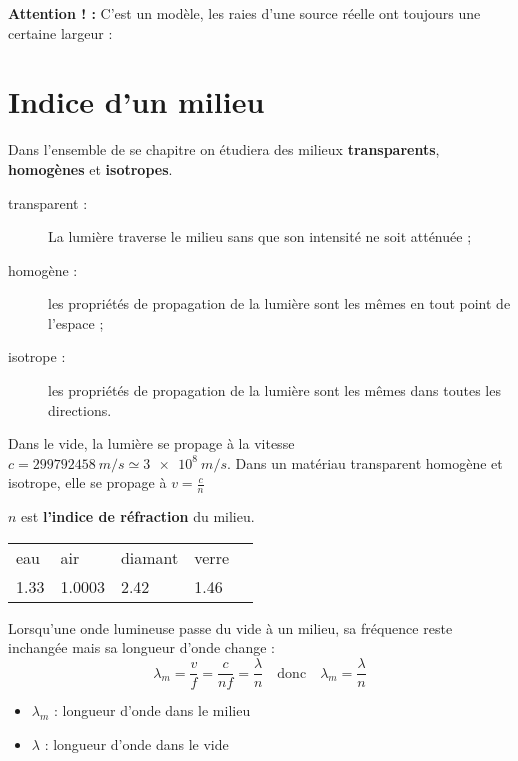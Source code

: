 \documentclass{cours}
\begin{document}
\textbf{Attention ! :} C'est un modèle, les raies d'une source réelle ont toujours une certaine largeur :
\begin{center}
\end{center}


\section{Indice d'un milieu}
Dans l'ensemble de se chapitre on étudiera des milieux \textbf{transparents}, \textbf{homogènes} et \textbf{isotropes}.
\begin{description}
\item[transparent : ] La lumière traverse le milieu sans que son intensité ne soit atténuée ; 
\item[homogène : ] les propriétés de propagation de la lumière sont les mêmes en tout point de l'espace ;
\item[isotrope :] les propriétés de propagation de la lumière sont les mêmes dans toutes les directions.  
\end{description}

Dans le vide, la lumière se propage à la vitesse $c=\SI{299792458}{m/s} \simeq \SI{3e8}{m/s}$. Dans un matériau transparent homogène et isotrope, elle se propage à $v=\frac{c}{n}$

$n$ est \textbf{l'indice de réfraction} du milieu.

\begin{center}
  \begin{tabular}{@{}lllll@{}}
    \toprule
    eau & air & diamant & verre \\
    1.33 & 1.0003 & 2.42 & 1.46 \\
    \bottomrule
  \end{tabular}
\end{center}
Lorsqu'une onde lumineuse passe du vide à un milieu, sa fréquence reste inchangée mais sa longueur d'onde change :
\begin{equation*}
\lambda_m = \frac{v}{f} = \frac{c}{nf} = \frac{\lambda}{n} \quad \text{donc} \quad \lambda_m=\frac{\lambda}{n}
\end{equation*}
\begin{itemize}
\item $\lambda_m$ : longueur d'onde dans le milieu
\item $\lambda$ : longueur d'onde dans le vide
\end{itemize}
\end{document}
